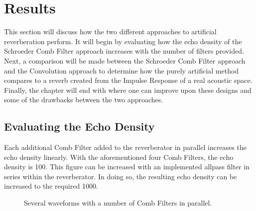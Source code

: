 \chapter{Results}
\hspace*{-0.187cm}This section will discuss how the two different approaches to artificial reverberation perform. It will begin by evaluating how the echo density of the Schroeder Comb Filter approach increases with the number of filters provided. Next, a comparison will be made between the Schroeder Comb Filter approach and the Convolution approach to determine how the purely artificial method compares to a reverb created from the Impulse Response of a real acoustic space. Finally, the chapter will end with where one can improve upon these designs and some of the drawbacks between the two approaches.

\section{Evaluating the Echo Density}
Each additional Comb Filter added to the reverberator in parallel increases the echo density linearly. With the aforementioned four Comb Filters, the echo density is 100. This figure can be increased with an implemented allpass filter in series within the reverberator. In doing so, the resulting echo density can be increased to the required 1000.

\begin{figure}[h] %
	\begin{center}
		\caption{Several waveforms with a number of Comb Filters in parallel.}
	\end{center}
\end{figure}

